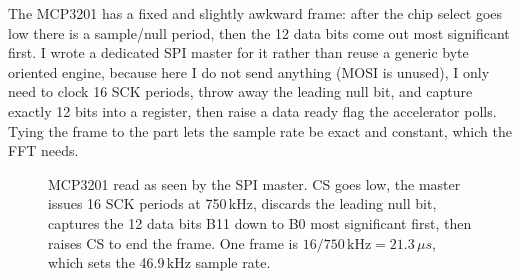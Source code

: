\documentclass[a4paper,11pt]{article}
\begin{document}
The MCP3201 has a fixed and slightly awkward frame: after the chip select goes low
there is a sample/null period, then the 12 data bits come out most significant
first. I wrote a dedicated SPI master for it rather than reuse a generic byte
oriented engine, because here I do not send anything (MOSI is unused), I only need
to clock 16 SCK periods, throw away the leading null bit, and capture exactly 12
bits into a register, then raise a data ready flag the accelerator polls. Tying the
frame to the part lets the sample rate be exact and constant, which the FFT needs.

\begin{figure}[H]
\centering
{}
\caption{MCP3201 read as seen by the SPI master. CS goes low, the master issues 16
SCK periods at 750\,kHz, discards the leading null bit, captures the 12 data bits
B11 down to B0 most significant first, then raises CS to end the frame. One frame
is $16 / 750\,\mathrm{kHz} = 21.3\,\mu s$, which sets the 46.9\,kHz sample rate.}
\label{fig:spi-timing}
\end{figure}
\end{document}
